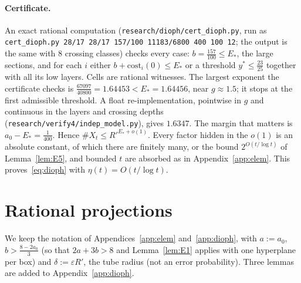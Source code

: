 \documentclass[aps,prx,twocolumn,superscriptaddress,nofootinbib,longbibliography]{revtex4-2}
\theoremstyle{plain}
\theoremstyle{definition}
\theoremstyle{remark}
\begin{document}
\paragraph{Certificate.} {\raggedright An exact rational computation (\texttt{research/dioph/cert\_dioph.py}, run as \texttt{cert\_dioph.py 28/17 28/17 157/100 11183/6800 400 100 12}; the output is the same with $8$ crossing classes) checks every case: $b=\tfrac{157}{100}\le E_*$, the large sections, and for each $i$ either $b+\mathrm{cost}_i(0)\le E_*$ or a threshold $y^*\le\tfrac{23}{25}$ together with all its low layers. Cells are rational witnesses. The largest exponent the certificate checks is $\tfrac{67097}{40800}=1.64453<E_*=1.64456$, near $g\approx1.5$; it stops at the first admissible threshold. A float re-implementation, pointwise in $g$ and continuous in the layers and crossing depths (\texttt{research/verify4/indep\_model.py}), gives $1.6347$. The margin that matters is $a_0-E_*=\tfrac1{400}$. Hence $\#X_t\le R'^{E_*+o(1)}$. Every factor hidden in the $o(1)$ is an absolute constant, of which there are finitely many, or the bound $2^{O(t/\log t)}$ of Lemma~\ref{lem:E5}, and bounded $t$ are absorbed as in Appendix~\ref{app:elem}. This proves~\eqref{eq:dioph} with $\eta(t)=O(t/\log t)$.\par}

\section{Rational projections}\label{app:proj}

We keep the notation of Appendices~\ref{app:elem} and~\ref{app:dioph}, with $a:=a_0$, $b>\tfrac{8-2a_0}3$ (so that $2a+3b>8$ and Lemma~\ref{lem:E1} applies with one hyperplane per box) and $\delta:=\varepsilon R'$, the tube radius (not an error probability). Three lemmas are added to Appendix~\ref{app:dioph}.
\end{document}
